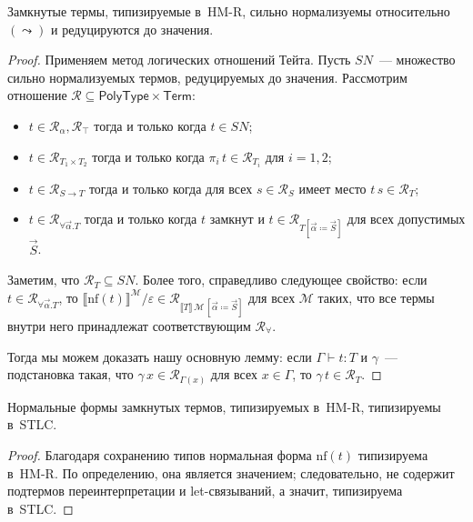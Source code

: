 \begin{theorem}
    Замкнутые термы, типизируемые в~HM-R, сильно
    нормализуемы относительно $(\leadsto)$ и
    редуцируются до значения.
\end{theorem}
\begin{proof}
    Применяем метод логических отношений Тейта. Пусть
    $SN$~--- множество сильно нормализуемых термов,
    редуцируемых до значения. Рассмотрим отношение
    $\mathcal{R}\subseteq
        \mathsf{PolyType}\times\mathsf{Term}$:
    \begin{itemize}
        \item $t\in\mathcal{R}_\alpha,\mathcal{R}_\top$
            тогда и только когда $t\in SN$;
        \item $t\in\mathcal{R}_{T_1\times T_2}$ тогда и
            только когда $\pi_i\,t\in\mathcal{R}_{T_i}$
            для $i=1,2$;
        \item $t\in\mathcal{R}_{S\to T}$ тогда и только
            когда для всех $s\in\mathcal{R}_S$ имеет
            место $t\,s\in\mathcal{R}_T$;
        \item $t\in\mathcal{R}_{\forall\vec{\alpha}.T}$
            тогда и только когда $t$ замкнут и
            $t\in\mathcal{R}_{
                T[\vec{\alpha}\coloneqq\vec{S}]}$
            для всех допустимых $\vec{S}$.
    \end{itemize}
    Заметим, что $\mathcal{R}_T\subseteq SN$. Более
    того, справедливо следующее свойство: если
    $t\in\mathcal{R}_{\forall\vec{\alpha}.T}$, то
    $\llbracket\mathrm{nf}(t)\rrbracket^\mathcal{M}/
    \varepsilon\in\mathcal{R}_{\llbracket T\rrbracket\,
        \mathcal{M}\,[\vec{\alpha}\coloneqq\vec{S}]}$
    для всех $\mathcal{M}$ таких, что все термы внутри
    него принадлежат соответствующим
    $\mathcal{R}_\forall$.

    Тогда мы можем доказать нашу основную лемму: если
    $\Gamma\vdash t:T$ и $\gamma$~--- подстановка
    такая, что $\gamma\,x\in\mathcal{R}_{\Gamma(x)}$
    для всех $x\in\Gamma$, то
    $\gamma\,t\in\mathcal{R}_T$.
\end{proof}

\begin{theorem}
    Нормальные формы замкнутых термов, типизируемых
    в~HM-R, типизируемы в~STLC.
\end{theorem}
\begin{proof}
    Благодаря сохранению типов нормальная форма
    $\mathrm{nf}(t)$ типизируема в~HM-R. По
    определению, она является значением; следовательно,
    не содержит подтермов переинтерпретации и
    let-связываний, а значит, типизируема в~STLC.
\end{proof}

